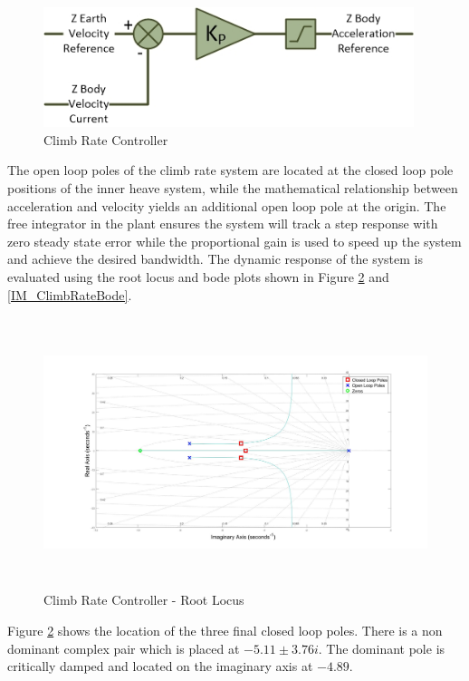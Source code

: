 	 \begin{figure}[H]
	 	\centering
	 	\includegraphics[height = 3.5cm]{../References/Diagrams/ClimbRateController.jpg}
	 	\caption{Climb Rate Controller}
	 	\label{IM_ClimbRateController}
	 \end{figure}		
	 
	 The open loop poles of the climb rate system are located at the closed loop pole positions of the inner heave system, while the mathematical relationship between acceleration and velocity yields an additional open loop pole at the origin. The free integrator in the plant ensures the system will track a step response with zero steady state error while the proportional gain is used to speed up the system and achieve the desired bandwidth. The dynamic response of the system is evaluated using the root locus and bode plots shown in Figure \ref{IM_ClimbRateRoot} and \ref{IM_ClimbRateBode}.
	 
	 \begin{figure}[H]
	 	\centering
	 	\includegraphics[height = 7.9cm]{../Design/Matlab/Controllers/climb_rate_root.jpg}
	 	\caption{Climb Rate Controller -  Root Locus}
	 	\label{IM_ClimbRateRoot}
	 \end{figure}
	 
	 Figure \ref{IM_ClimbRateRoot} shows the location of the three final closed loop poles. There is a non dominant complex pair which is placed at $-5.11 \pm 3.76i$. The dominant pole is critically damped and located on the imaginary axis at $-4.89$.
	 
